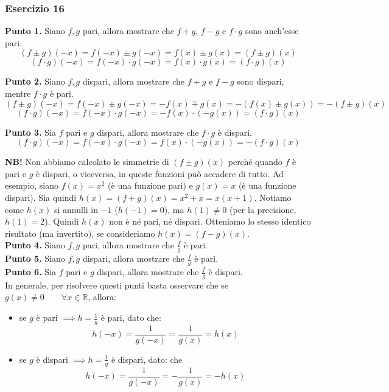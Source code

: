 \documentclass{article}
\begin{document}
\subsubsection{Esercizio 16}
\textbf{Punto 1.} Siano $f, g$ pari, allora mostrare che $f + g$, $f - g$ e $f \cdot g$ sono anch'esse pari.
\begin{equation*}
    (f \pm g)(-x) = f(-x) \pm g(-x) = f(x) \pm g(x) = (f \pm g)(x)
\end{equation*}
\begin{equation*}
    (f \cdot g)(-x) = f(-x) \cdot g(-x) = f(x) \cdot g(x) = (f \cdot g)(x)
\end{equation*}

\noindent\textbf{Punto 2.} Siano $f, g$ dispari, allora mostrare che $f + g$ e $f - g$ sono dispari, mentre $f \cdot g$ è pari.
\begin{equation*}
    (f \pm g)(-x) = f(-x) \pm g(-x) = -f(x) \mp g(x) = -(f(x) \pm g(x)) = - (f \pm g)(x)
\end{equation*}
\begin{equation*}
    (f \cdot g)(-x) = f(-x) \cdot g(-x) = -f(x) \cdot (-g(x)) = (f \cdot g)(x)
\end{equation*}

\noindent\textbf{Punto 3.} Sia $f$ pari e $g$ dispari, allora mostrare che $f \cdot g$ è dispari.
\begin{equation*}
    (f \cdot g)(-x) = f(-x) \cdot g(-x) = f(x) \cdot (-g(x)) = - (f \cdot g)(x)
\end{equation*}

\noindent\textbf{NB!} Non abbiamo calcolato le simmetrie di $(f \pm g)(x)$ perché quando $f$ è pari e $g$ è dispari, o viceversa, in queste funzioni può accadere di tutto. Ad esempio, siano $f(x) = x^2$ (è una funzione pari) e $g(x) = x$ (è una funzione dispari). Sia quindi $h(x) = (f + g)(x) = x^2 + x = x(x + 1)$. Notiamo come $h(x)$ si annulli in $-1$ ($h(-1) = 0$), ma $h(1) \neq 0$ (per la precisione, $h(1) = 2$). Quindi $h(x)$ non è né pari, né dispari. Otteniamo lo stesso identico risultato (ma invertito), se consideriamo $h(x) = (f - g)(x)$.\\

\noindent\textbf{Punto 4.} Siano $f, g$ pari, allora mostrare che $\frac{f}{g}$ è pari. \\
\noindent\textbf{Punto 5.} Siano $f, g$ dispari, allora mostrare che $\frac{f}{g}$ è pari.\\
\noindent\textbf{Punto 6.} Sia $f$ pari e $g$ dispari, allora mostrare che $\frac{f}{g}$ è dispari.\\
In generale, per risolvere questi punti basta osservare che se $g(x) \neq 0 \qquad \forall x \in \mathbb{R}$, allora:
\begin{itemize}
    \item se $g$ è pari $\implies h = \frac{1}{g}$ è pari, dato che: $$h(-x) = \frac{1}{g(-x)} = \frac{1}{g(x)} = h(x)$$
    \item se $g$ è dispari $\implies h = \frac{1}{g}$ è dispari, dato: che $$h(-x) = \frac{1}{g(-x)} = -\frac{1}{g(x)} = -h(x)$$
\end{itemize}
\end{document}
